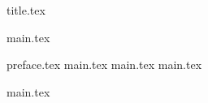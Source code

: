 




{title.tex}

\clearpage

{main.tex}

\tableofcontents

\clearpage
{}
\pagestyle{fancy}
\setcounter{page}{6}

\clearpage

{preface.tex}
{main.tex}
{main.tex}
{main.tex}

\clearpage
{}
{}
\renewcommand\bibname{Перелік посилань}


{main.tex}


